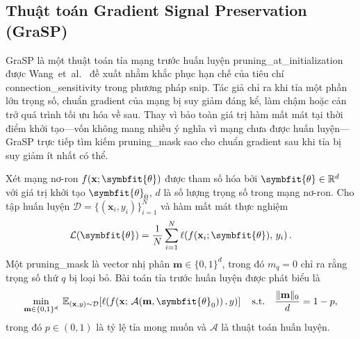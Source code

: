 \subsection{Thuật toán Gradient Signal Preservation (GraSP)}
GraSP là một thuật toán tỉa mạng trước huấn luyện \gls{pruning_at_initialization} được Wang~et~al.~\cite{grasp} đề xuất nhằm
khắc phục hạn chế của tiêu chí \gls{connection_sensitivity} trong phương pháp
\gls{snip}.
Tác giả chỉ ra khi tỉa một phần lớn trọng số, chuẩn gradient của
mạng bị suy giảm đáng kể, làm chậm hoặc cản trở quá trình tối ưu hóa về sau.
Thay vì bảo toàn giá trị hàm mất mát tại thời điểm khởi tạo—vốn không
mang nhiều ý nghĩa vì mạng chưa được huấn luyện—GraSP trực tiếp tìm kiếm
\gls{pruning_mask} sao cho chuẩn gradient sau khi tỉa bị suy giảm ít nhất có thể.

Xét mạng nơ-ron $f(\mathbf{x};\symbfit{\theta})$ được tham số hóa bởi
$\symbfit{\theta} \in \mathbb{R}^{d}$ với giá trị khởi tạo $\symbfit{\theta}_0$, $d$ là số lượng trọng số trong mạng nơ-ron.
Cho tập huấn luyện $\mathcal{D} = \{(\mathbf{x}_i, y_i)\}_{i=1}^{N}$
và hàm mất mát thực nghiệm
\begin{equation}
    \mathcal{L}(\symbfit{\theta})
    = \frac{1}{N}\sum_{i=1}^{N}
    \ell\!\left(f(\mathbf{x}_i;\symbfit{\theta}),\, y_i\right).
\end{equation}
Một \gls{pruning_mask} là vector nhị phân
$\mathbf{m} \in \{0,1\}^{d}$, trong đó $m_q = 0$ chỉ ra rằng trọng số
thứ $q$ bị loại bỏ.
Bài toán tỉa trước huấn luyện được phát biểu là
\begin{equation}
    \min_{\mathbf{m}\in\{0,1\}^d}
    \;\mathbb{E}_{(\mathbf{x},y)\sim\mathcal{D}}
    \!\left[\ell\!\left(f\!\left(\mathbf{x};\,
        \mathcal{A}(\mathbf{m},\symbfit{\theta}_0)\right), y\right)\right]
    \quad \text{s.t.} \quad
    \frac{\|\mathbf{m}\|_0}{d} = 1 - p,
    \label{eq:foresight_pruning}
\end{equation}
trong đó $p \in (0,1)$ là tỷ lệ tỉa mong muốn và $\mathcal{A}$
là thuật toán huấn luyện.

